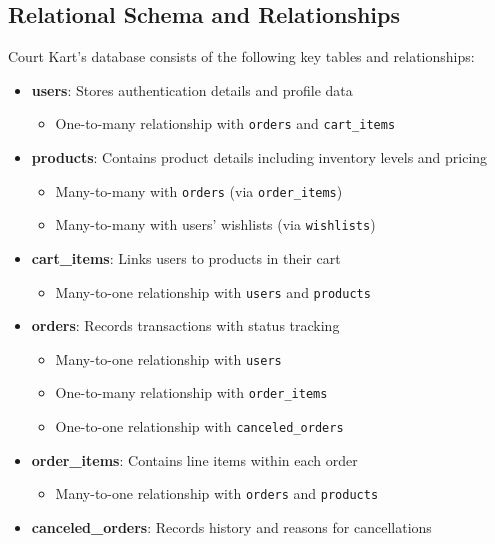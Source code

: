 \documentclass{article}
\begin{document}
\subsection{Relational Schema and Relationships}

Court Kart's database consists of the following key tables and relationships:

\begin{itemize}
	\item \textbf{users}: Stores authentication details and profile data
	      \begin{itemize}
		      \item One-to-many relationship with \texttt{orders} and \texttt{cart\_items}
	      \end{itemize}
	\item \textbf{products}: Contains product details including inventory levels and pricing
	      \begin{itemize}
		      \item Many-to-many with \texttt{orders} (via \texttt{order\_items})
		      \item Many-to-many with users' wishlists (via \texttt{wishlists})
	      \end{itemize}
	\item \textbf{cart\_items}: Links users to products in their cart
	      \begin{itemize}
		      \item Many-to-one relationship with \texttt{users} and \texttt{products}
	      \end{itemize}
	\item \textbf{orders}: Records transactions with status tracking
	      \begin{itemize}
		      \item Many-to-one relationship with \texttt{users}
		      \item One-to-many relationship with \texttt{order\_items}
		      \item One-to-one relationship with \texttt{canceled\_orders}
	      \end{itemize}
	\item \textbf{order\_items}: Contains line items within each order
	      \begin{itemize}
		      \item Many-to-one relationship with \texttt{orders} and \texttt{products}
	      \end{itemize}
	\item \textbf{canceled\_orders}: Records history and reasons for cancellations

\end{itemize}
\end{document}
